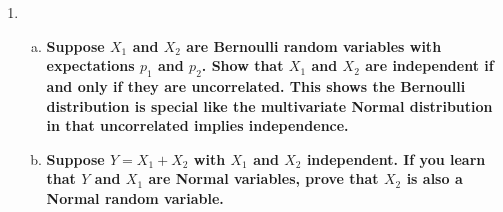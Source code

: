 \documentclass[11pt]{article}
\newenvironment{solution}
  {\renewcommand\qedsymbol{$\blacksquare$}\begin{proof}[Solution]}
  {\end{proof}}
\begin{document}
\begin{enumerate}
\begin{enumerate}[a)]
\begin{solution}
      We check that
      \begin{align*}
        f_X(x)f_Y(y) &= 2x(1-|y|) I(0 < x < 1) I(-1 < y < 1) \\
        &\neq I(0 < x < 1, -x < y, x) = f_{XY}(x, y)
      \end{align*}
      confirming that $X$ and $Y$ are not independent.
      \end{solution}

      \item \textbf{Show that $X$ and $Y$ are uncorrelated.}
      
      \begin{solution}
      Note that
      \[
        \mathbb{E}\left[XY \right] = \int_0^1 \int_{-x}^x xy I(0 < x < 1, -x < y < x) \, dy \, dx = 0
      \]
      by symmetry. Similarly,
      \[
        \mathbb{E}\left[X \right] = \int_0^1 x(2x) \, dx = 1
      \]
      and 
      \[
        \mathbb{E}\left[Y \right] = \int_{-1}^1 y(1 - |y|) \, dy = 0
      \]
      by symmetry. Thus, we have that
      \[
        \mathbb{E}\left[XY \right] - \mathbb{E}\left[X \right] \mathbb{E}\left[Y \right] = 0
      \]
      so $X$ and $Y$ are uncorrelated, as desired.
      \end{solution}
    
    \end{enumerate}

    \newpage
    \item 
    \begin{enumerate}[a)]
      \item \textbf{Suppose $X_1$ and $X_2$ are Bernoulli random variables with expectations $p_1$ and $p_2$. Show that $X_1$ and $X_2$ are independent if and only if they are uncorrelated.
      This shows the Bernoulli distribution is special like the multivariate Normal distribution in that uncorrelated implies independence.}
      \item \textbf{Suppose $Y = X_1 + X_2$ with $X_1$ and $X_2$ independent. If you learn that $Y$ and $X_1$ are
      Normal variables, prove that $X_2$ is also a Normal random variable.}
    \end{enumerate}
    
\end{enumerate}
\end{document}
